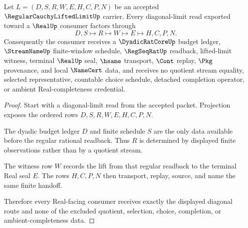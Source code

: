 \begin{theorem}
\label{thm:regular-cauchy-lifted-limit-diagonal-handoff}
Let $L=(D,S,R,W,E,H,C,P,N)$ be an accepted $\RegularCauchyLiftedLimitUp$ carrier. Every diagonal-limit read exported toward a $\RealUp$ consumer factors through
$$
D,S \longmapsto R \longmapsto W \longmapsto E \longmapsto H,C,P,N .
$$
Consequently the consumer receives a $\DyadicRatCoreUp$ budget ledger, $\StreamNameUp$ finite-window schedule, $\RegSeqRatUp$ readback, lifted-limit witness, terminal $\RealUp$ seal, $\hsame$ transport, $\Cont$ replay, $\Pkg$ provenance, and local $\NameCert$ data, and receives no quotient stream equality, selected representative, countable choice schedule, detached completion operator, or ambient Real-completeness credential.
\end{theorem}
\begin{proof}
Start with a diagonal-limit read from the accepted packet. Projection exposes the ordered rows $D,S,R,W,E,H,C,P,N$.

The dyadic budget ledger $D$ and finite schedule $S$ are the only data available before the regular rational readback. Thus $R$ is determined by displayed finite observations rather than by a quotient stream.

The witness row $W$ records the lift from that regular readback to the terminal Real seal $E$. The rows $H,C,P,N$ then transport, replay, source, and name the same finite handoff.

Therefore every Real-facing consumer receives exactly the displayed diagonal route and none of the excluded quotient, selection, choice, completion, or ambient-completeness data.
\end{proof}


\begin{closurestatus}{\RegularCauchyLiftedLimitUp}
  \theoryclosure{\seedClosure}
  \formalstatus{\unformalizedV}
\end{closurestatus}
